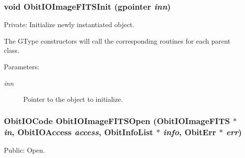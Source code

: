 \subsubsection{\setlength{\rightskip}{0pt plus 5cm}void Obit\-IOImage\-FITSInit (gpointer {\em inn})}\label{ObitIOImageFITS_8c_a3}


Private: Initialize newly instantiated object. 

The GType constructors will call the corresponding routines for each parent class. \begin{Desc}
\item[Parameters:]
\begin{description}
\item[{\em inn}]Pointer to the object to initialize. \end{description}
\end{Desc}
\subsubsection{\setlength{\rightskip}{0pt plus 5cm}Obit\-IOCode Obit\-IOImage\-FITSOpen ({\bf Obit\-IOImage\-FITS} $\ast$ {\em in}, Obit\-IOAccess {\em access}, {\bf Obit\-Info\-List} $\ast$ {\em info}, {\bf Obit\-Err} $\ast$ {\em err})}\label{ObitIOImageFITS_8c_a25}


Public: Open. 

